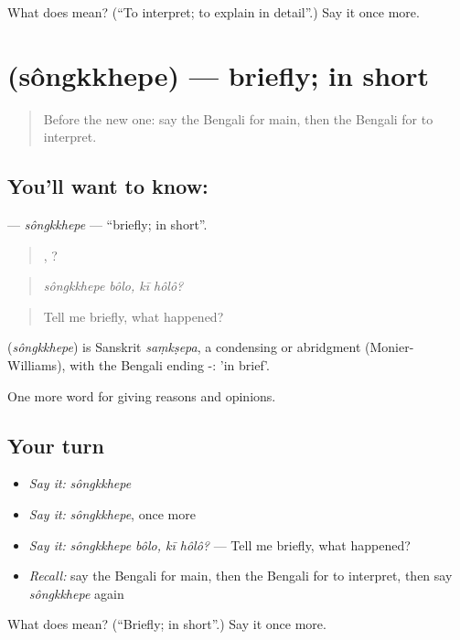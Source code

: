 \begin{tcolorbox}[breakable,colback=teal!4,colframe=teal!35!black,title={Before you move on}]
What does   mean? (\textquotedblleft{}To interpret; to explain in detail\textquotedblright{}.) Say it once more.
\end{tcolorbox}
\section[\texorpdfstring{\bn{সংক্ষেপে} (sôngkkhepe)}{সংক্ষেপে (sôngkkhepe)}]{ (sôngkkhepe) — briefly; in short}

\label{lesson:BN-C336-songkkhepe}



\begin{quote}
Before the new one: say the Bengali for main, then the Bengali for to interpret.
\end{quote}

\subsection*{You'll want to know: }
\textbf{} — \emph{sôngkkhepe} — \textquotedblleft{}briefly; in short\textquotedblright{}.

\begin{quote}
 ,  ?
\end{quote}

\begin{quote}
\emph{sôngkkhepe bôlo, kī hôlô?}
\end{quote}

\begin{quote}
Tell me briefly, what happened?
\end{quote}

\begin{cousinweb}
\textbf{} (\emph{sôngkkhepe}) is Sanskrit \emph{saṃkṣepa}, a condensing or abridgment (Monier-Williams), with the Bengali ending -: 'in brief'.
\end{cousinweb}

\begin{grammarlens}[title={What you've built}]
One more word for giving reasons and opinions.
\end{grammarlens}

\subsection*{Your turn}
\begin{itemize}
\raggedright
  \item \emph{Say it:} \emph{sôngkkhepe}
  \item \emph{Say it:} \emph{sôngkkhepe}, once more
  \item \emph{Say it:} \emph{sôngkkhepe bôlo, kī hôlô?} — Tell me briefly, what happened?
  \item \emph{Recall:} say the Bengali for main, then the Bengali for to interpret, then say \emph{sôngkkhepe} again
\end{itemize}

\begin{tcolorbox}[breakable,colback=teal!4,colframe=teal!35!black,title={Before you move on}]
What does  mean? (\textquotedblleft{}Briefly; in short\textquotedblright{}.) Say it once more.
\end{tcolorbox}
